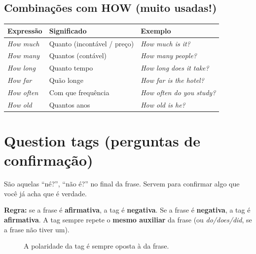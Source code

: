 \documentclass[12pt,a4paper,oneside]{book}
\newcommand{\en}[1]{\textit{#1}}                 %
\newcommand{\aux}[1]{\textbf{\textcolor{blue!60!black}{#1}}} %
\begin{document}
\subsection{Combinações com HOW (muito usadas!)}

\begin{center}
\begin{tabularx}{\textwidth}{@{}lXl@{}}
\toprule
\textbf{Expressão} & \textbf{Significado} & \textbf{Exemplo} \\
\midrule
\en{How much}\index{how much / how many} & Quanto (incontável / preço) & \en{How much is it?} \\
\en{How many} & Quantos (contável) & \en{How many people?} \\
\en{How long} & Quanto tempo & \en{How long does it take?} \\
\en{How far} & Quão longe & \en{How far is the hotel?} \\
\en{How often} & Com que frequência & \en{How often do you study?} \\
\en{How old} & Quantos anos & \en{How old is he?} \\
\bottomrule
\end{tabularx}
\end{center}

\section{Question tags (perguntas de confirmação)}

São aquelas ``né?'', ``não é?'' no final da frase. Servem para confirmar algo que você já acha que é verdade.

\textbf{Regra:} se a frase é \textbf{afirmativa}, a tag é \textbf{negativa}. Se a frase é \textbf{negativa}, a tag é \textbf{afirmativa}. A tag sempre repete o \textbf{mesmo auxiliar} da frase (ou \en{do/does/did}, se a frase não tiver um).

\begin{figure}[H]
\centering
{}
\caption{A polaridade da tag é sempre oposta à da frase.}
\end{figure}
\end{document}
